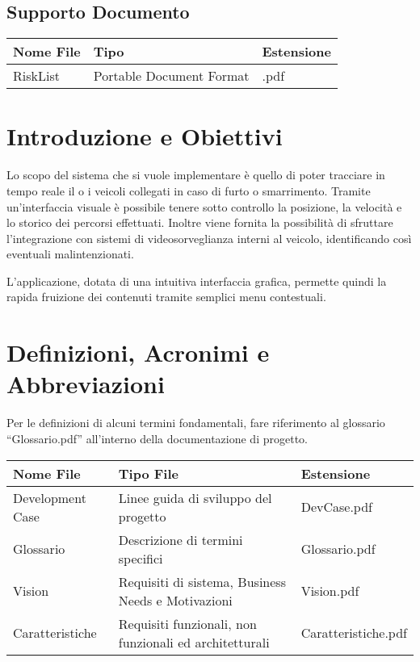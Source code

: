 \documentclass[a4paper,12pt]{article}
\begin{document}
\subsection{Supporto Documento}
\begin{table*}[ht]
\begin{center}
\begin{tabular}{p{6cm} p{5cm} p{2cm}}
\rowcolor{Ash}
\hline
Nome File & Tipo & Estensione \\ \hline
RiskList & Portable Document Format & .pdf \\ \hline
\end{tabular}
\end{center}
\end{table*}

\clearpage

\pagebreak

\section{Introduzione e Obiettivi}

Lo scopo del sistema che si vuole implementare è quello di poter tracciare in tempo reale il o i veicoli collegati in caso di furto o smarrimento. Tramite un'interfaccia visuale è possibile tenere sotto controllo la posizione, la velocità e lo storico dei percorsi effettuati. Inoltre viene fornita la possibilità di sfruttare l'integrazione con sistemi di videosorveglianza interni al veicolo, identificando così eventuali malintenzionati. 

L'applicazione, dotata di una intuitiva interfaccia grafica, permette quindi la rapida fruizione dei contenuti tramite semplici menu contestuali.


\section{Definizioni, Acronimi e Abbreviazioni}

Per le definizioni di alcuni termini fondamentali, fare riferimento al glossario ``Glossario.pdf'' all'interno della documentazione di progetto.

\begin{table}[h]
\begin{center}
\begin{tabular}{ p{4.5cm} p{4.5cm} p{3.5cm} } 
\rowcolor{Ash}	
\hline	
Nome File & Tipo File & Estensione  \\ \hline
Development Case & Linee guida di sviluppo del progetto & DevCase.pdf  \\ 
Glossario & Descrizione di termini specifici & Glossario.pdf  \\ 
Vision & Requisiti di sistema, Business Needs e Motivazioni & Vision.pdf  \\ 
Caratteristiche & Requisiti funzionali, non funzionali ed architetturali & Caratteristiche.pdf  \\ \hline
\end{tabular}
\end{center}
\end{table}
\end{document}
